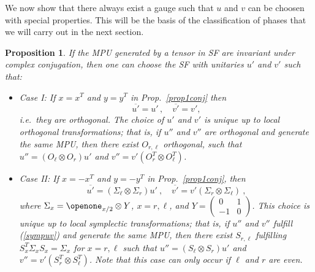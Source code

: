 \documentclass[pra,twocolumn,nofootinbib,superscriptaddress]{revtex4-1}
\newcommand{\be}{\begin{equation}}
\newcommand{\ee}{\end{equation}}
\newtheorem{prop}[thm]{Proposition}
\begin{document}
We now show that there always exist a gauge such that $u$ and $v$ can be choosen
with special properties. This will be the basis of the classification of phases
that we will carry out in the next section.

\begin{prop}
	\label{corconj}
	If the MPU generated by a tensor in SF are invariant under complex
	conjugation, then one can choose the SF with unitaries $u'$
	and $v'$ such that:
	\begin{itemize}
		\item Case I: If $x=x^T$ and $y=y^T$ in Prop.~\ref{prop1conj} then
		      \be
		      \label{ortuv}
		      \overline{u'} = u'\,, \quad \overline{v'}=v',
		      \ee
		      i.e.\ they are orthogonal. The choice of $u'$ and $v'$
		      is unique up to local orthogonal transformations; that is, if $u''$ and $v''$ are orthogonal
		      and generate the same MPU, then there exist $O_{r,\ell}$ orthogonal, such that
		      $u''=(O_\ell\otimes O_r) u'$ and $v''=v' (O_r^T\otimes O_\ell^T)$.
		\item Case II: If $x=-x^T$ and $y=-y^T$ in Prop.~\ref{prop1conj}, then
		      \be
		      \label{sympuv}
		      \overline{u'} = (\Sigma_{\ell}\otimes\Sigma_r) u'\ ,\quad
		      \overline{v'}= v'(\Sigma_r\otimes\Sigma_\ell)\ ,
		      \ee
		      where $\Sigma_x=\openone_{x/2}\otimes Y$, $x=r,\ell$,
		      and $Y=\left(\begin{smallmatrix}0&1\\-1&0\end{smallmatrix}\right)$.
		      This choice is unique up to local symplectic transformations;
		      that is, if $u''$ and $v''$ fulfill (\ref{sympuv}) and generate the same MPU, then
		      there exist $S_{r,\ell}$  fulfilling $S_x^T \Sigma_x  S_x=\Sigma_x$
		      for $x=r,\ell$ such that $u''=(S_\ell\otimes S_r) u'$ and $v''=v' (S_r^T\otimes S_\ell^T)$.
		      Note that this case can only occur if $\ell$ and $r$ are even.
	\end{itemize}
\end{prop}
\end{document}
